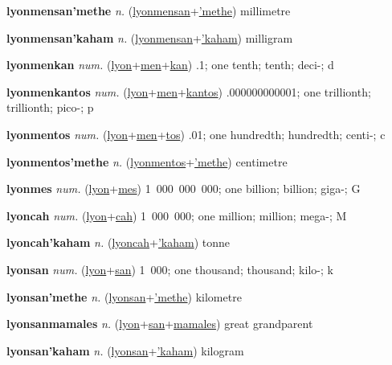 \textbf{\hypertarget{lyonmensan'methe}{lyonmensan'methe}} \textit{n.} (\hyperlink{lyonmensan}{lyonmensan}+\allowbreak \hyperlink{'methe}{'methe})
millimetre

\textbf{\hypertarget{lyonmensan'kaham}{lyonmensan'kaham}} \textit{n.} (\hyperlink{lyonmensan}{lyonmensan}+\allowbreak \hyperlink{'kaham}{'kaham})
milligram

\textbf{\hypertarget{lyonmenkan}{lyonmenkan}} \textit{num.} (\hyperlink{lyon}{lyon}+\allowbreak \hyperlink{men}{men}+\allowbreak \hyperlink{kan}{kan})
.1; one tenth; tenth; deci-; d

\textbf{\hypertarget{lyonmenkantos}{lyonmenkantos}} \textit{num.} (\hyperlink{lyon}{lyon}+\allowbreak \hyperlink{men}{men}+\allowbreak \hyperlink{kantos}{kantos})
.000000000001; one trillionth; trillionth; pico-; p

\textbf{\hypertarget{lyonmentos}{lyonmentos}} \textit{num.} (\hyperlink{lyon}{lyon}+\allowbreak \hyperlink{men}{men}+\allowbreak \hyperlink{tos}{tos})
.01; one hundredth; hundredth; centi-; c

\textbf{\hypertarget{lyonmentos'methe}{lyonmentos'methe}} \textit{n.} (\hyperlink{lyonmentos}{lyonmentos}+\allowbreak \hyperlink{'methe}{'methe})
centimetre

\textbf{\hypertarget{lyonmes}{lyonmes}} \textit{num.} (\hyperlink{lyon}{lyon}+\allowbreak \hyperlink{mes}{mes})
1~000~000~000; one billion; billion; giga-; G

\textbf{\hypertarget{lyoncah}{lyoncah}} \textit{num.} (\hyperlink{lyon}{lyon}+\allowbreak \hyperlink{cah}{cah})
1~000~000; one million; million; mega-; M

\textbf{\hypertarget{lyoncah'kaham}{lyoncah'kaham}} \textit{n.} (\hyperlink{lyoncah}{lyoncah}+\allowbreak \hyperlink{'kaham}{'kaham})
tonne

\textbf{\hypertarget{lyonsan}{lyonsan}} \textit{num.} (\hyperlink{lyon}{lyon}+\allowbreak \hyperlink{san}{san})
1~000; one thousand; thousand; kilo-; k

\textbf{\hypertarget{lyonsan'methe}{lyonsan'methe}} \textit{n.} (\hyperlink{lyonsan}{lyonsan}+\allowbreak \hyperlink{'methe}{'methe})
kilometre

\textbf{\hypertarget{lyonsanmamales}{lyonsanmamales}} \textit{n.} (\hyperlink{lyon}{lyon}+\allowbreak \hyperlink{san}{san}+\allowbreak \hyperlink{mamales}{mamales})
great grandparent

\textbf{\hypertarget{lyonsan'kaham}{lyonsan'kaham}} \textit{n.} (\hyperlink{lyonsan}{lyonsan}+\allowbreak \hyperlink{'kaham}{'kaham})
kilogram

